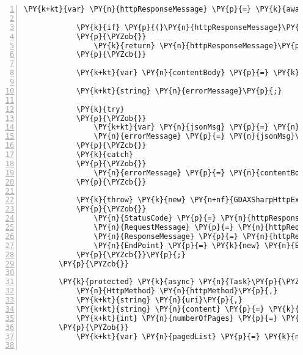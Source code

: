 \begin{Verbatim}[commandchars=\\\{\},numbers=left,firstnumber=1,stepnumber=1,numberblanklines=0]
            \PY{k+kt}{var} \PY{n}{httpResponseMessage} \PY{p}{=} \PY{k}{await} \PY{n}{httpClient}\PY{p}{.}\PY{n}{SendAsync}\PY{p}{(}\PY{n}{httpRequestMessage}\PY{p}{)}\PY{p}{.}\PY{n}{ConfigureAwait}\PY{p}{(}\PY{k}{false}\PY{p}{)}\PY{p}{;}

            \PY{k}{if} \PY{p}{(}\PY{n}{httpResponseMessage}\PY{p}{.}\PY{n}{IsSuccessStatusCode}\PY{p}{)}
            \PY{p}{\PYZob{}}
                \PY{k}{return} \PY{n}{httpResponseMessage}\PY{p}{;}
            \PY{p}{\PYZcb{}}

            \PY{k+kt}{var} \PY{n}{contentBody} \PY{p}{=} \PY{k}{await} \PY{n}{httpClient}\PY{p}{.}\PY{n}{ReadAsStringAsync}\PY{p}{(}\PY{n}{httpResponseMessage}\PY{p}{)}\PY{p}{.}\PY{n}{ConfigureAwait}\PY{p}{(}\PY{k}{false}\PY{p}{)}\PY{p}{;}

            \PY{k+kt}{string} \PY{n}{errorMessage}\PY{p}{;}

            \PY{k}{try}
            \PY{p}{\PYZob{}}
                \PY{k+kt}{var} \PY{n}{jsonMsg} \PY{p}{=} \PY{n}{JsonConfig}\PY{p}{.}\PY{n}{DeserializeObject}\PY{p}{\PYZlt{}}\PY{n}{GDAXErrorMessage}\PY{p}{\PYZgt{}}\PY{p}{(}\PY{n}{contentBody}\PY{p}{)}\PY{p}{;}
                \PY{n}{errorMessage} \PY{p}{=} \PY{n}{jsonMsg}\PY{p}{.}\PY{n}{Message}\PY{p}{;}
            \PY{p}{\PYZcb{}}
            \PY{k}{catch}
            \PY{p}{\PYZob{}}
                \PY{n}{errorMessage} \PY{p}{=} \PY{n}{contentBody}\PY{p}{;}
            \PY{p}{\PYZcb{}}

            \PY{k}{throw} \PY{k}{new} \PY{n+nf}{GDAXSharpHttpException}\PY{p}{(}\PY{n}{errorMessage}\PY{p}{)}
            \PY{p}{\PYZob{}}
                \PY{n}{StatusCode} \PY{p}{=} \PY{n}{httpResponseMessage}\PY{p}{.}\PY{n}{StatusCode}\PY{p}{,}
                \PY{n}{RequestMessage} \PY{p}{=} \PY{n}{httpRequestMessage}\PY{p}{,}
                \PY{n}{ResponseMessage} \PY{p}{=} \PY{n}{httpResponseMessage}\PY{p}{,}
                \PY{n}{EndPoint} \PY{p}{=} \PY{k}{new} \PY{n}{EndPoint}\PY{p}{(}\PY{n}{httpMethod}\PY{p}{,} \PY{n}{uri}\PY{p}{,} \PY{n}{content}\PY{p}{)}
            \PY{p}{\PYZcb{}}\PY{p}{;}
        \PY{p}{\PYZcb{}}

        \PY{k}{protected} \PY{k}{async} \PY{n}{Task}\PY{p}{\PYZlt{}}\PY{n}{IList}\PY{p}{\PYZlt{}}\PY{n}{IList}\PY{p}{\PYZlt{}}\PY{n}{T}\PY{p}{\PYZgt{}}\PY{p}{\PYZgt{}}\PY{p}{\PYZgt{}} \PY{n}{SendHttpRequestMessagePagedAsync}\PY{p}{\PYZlt{}}\PY{n}{T}\PY{p}{\PYZgt{}}\PY{p}{(}
            \PY{n}{HttpMethod} \PY{n}{httpMethod}\PY{p}{,}
            \PY{k+kt}{string} \PY{n}{uri}\PY{p}{,}
            \PY{k+kt}{string} \PY{n}{content} \PY{p}{=} \PY{k}{null}\PY{p}{,}
            \PY{k+kt}{int} \PY{n}{numberOfPages} \PY{p}{=} \PY{l+m}{0}\PY{p}{)}
        \PY{p}{\PYZob{}}
            \PY{k+kt}{var} \PY{n}{pagedList} \PY{p}{=} \PY{k}{new} \PY{n}{List}\PY{p}{\PYZlt{}}\PY{n}{IList}\PY{p}{\PYZlt{}}\PY{n}{T}\PY{p}{\PYZgt{}}\PY{p}{\PYZgt{}}\PY{p}{(}\PY{p}{)}\PY{p}{;}


\end{Verbatim}
